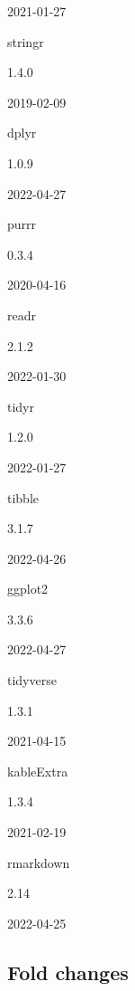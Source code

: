 \documentclass[9pt,lineno]{elife}
\begin{document}
\begin{landscape}
\begin{landscape}
2021-01-27

stringr

1.4.0

2019-02-09

dplyr

1.0.9

2022-04-27

purrr

0.3.4

2020-04-16

readr

2.1.2

2022-01-30

tidyr

1.2.0

2022-01-27

tibble

3.1.7

2022-04-26

ggplot2

3.3.6

2022-04-27

tidyverse

1.3.1

2021-04-15

kableExtra

1.3.4

2021-02-19

rmarkdown

2.14

2022-04-25

\clearpage

\hypertarget{sup-foldchanges}{%
\subsection{Fold changes}\label{sup-foldchanges}}

\begin{landscape}\begingroup\fontsize{5}{7}\selectfont


\end{landscape}
\end{landscape}
\end{landscape}
\end{document}
